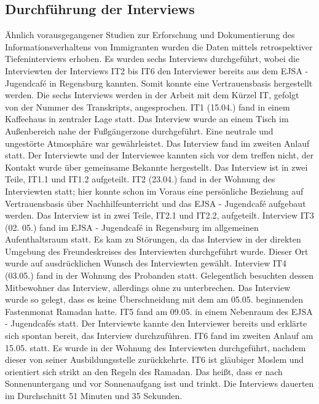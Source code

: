 \subsection{Durchführung der Interviews}

Ähnlich vorausgegangener Studien zur Erforschung und Dokumentierung des Informationsverhaltens von Immigranten \citep{courtright2005health}\citep{oduntan2017investigating}\citep{mykyttschak2018}\citep{lingel2011information}\citep{shoham2008immigrants} wurden die Daten mittels retrospektiver Tiefeninterviews erhoben. Es wurden sechs Interviews durchgeführt, wobei die Interviewten der Interviews IT2 bis IT6 den Interviewer bereits aus dem EJSA - Jugendcafé in Regensburg kannten. Somit konnte eine Vertrauensbasis hergestellt werden.\newline
Die sechs Interviews werden in der Arbeit mit dem Kürzel IT, gefolgt von der Nummer des Transkripts, angesprochen.\newline
IT1 (15.04.) fand in einem Kaffeehaus in zentraler Lage statt. Das Interview wurde an einem Tisch im Außenbereich nahe der Fußgängerzone durchgeführt. Eine neutrale und ungestörte Atmosphäre war gewährleistet. Das Interview fand im zweiten Anlauf statt. Der Interviewte und der Interviewee kannten sich vor dem treffen nicht, der Kontakt wurde über gemeinsame Bekannte hergestellt. Das Interview ist in zwei Teile, IT1.1 und IT1.2 aufgeteilt.\newline
IT2 (23.04.) fand in der Wohnung des Interviewten statt; hier konnte schon im Voraus eine persönliche Beziehung auf Vertrauensbasis über Nachhilfeunterricht und das EJSA - Jugendcafé aufgebaut werden. Das Interview ist in zwei Teile, IT2.1 und IT2.2, aufgeteilt.\newline
Interview IT3 (02. 05.) fand im EJSA - Jugendcafé in Regensburg im allgemeinen Aufenthaltsraum statt. Es kam zu Störungen, da das Interview in der direkten Umgebung des Freundeskreises des Interviewten durchgeführt wurde. Dieser Ort wurde auf ausdrücklichen Wunsch des Interviewten gewählt.\newline
Interview IT4 (03.05.) fand in der Wohnung des Probanden statt. Gelegentlich besuchten dessen Mitbewohner das Interview, allerdings ohne zu unterbrechen. Das Interview wurde so gelegt, dass es keine Überschneidung mit dem am 05.05. beginnenden Fastenmonat Ramadan hatte.\newline
IT5 fand am 09.05. in einem Nebenraum des EJSA - Jugendcafés statt. Der Interviewte kannte den Interviewer bereits und erklärte sich spontan bereit, das Interview durchzuführen.
IT6 fand im zweiten Anlauf am 15.05. statt. Es wurde in der Wohnung des Interviewten durchgeführt, nachdem dieser von seiner Ausbildungsstelle zurückkehrte. IT6 ist gläubiger Moslem und orientiert sich strikt an den Regeln des Ramadan. Das heißt, dass er nach Sonnenuntergang und vor Sonnenaufgang isst und trinkt.\newline
Die Interviews dauerten im Durchschnitt 51 Minuten und 35 Sekunden.\newline

